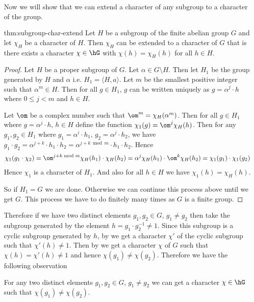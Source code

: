 Now we will show that we can extend a character of any subgroup to a character of the group.
\begin{Theorem}{}{thm:subgroup-char-extend}
  Let $H$ be a subgroup of the finite abelian group $G$ and let $\chi_H$ be a character of $H$. Then $\chi_H$ can be extended to a character of $G$ that is there exists a character $\chi\in\hG$ with $\chi(h)=\chi_H(h)$ for all $h\in H$.
\end{Theorem}
\begin{proof}
  Let $H$ be a proper subgroup of $G$. Let $\alpha\in G\setminus H$. Then let $H_1$ be the group generated by $H$ and $\alpha$ i.e. $H_1=\langle H,a\rangle$. Let $m$ be the smallest positive integer such that $\alpha^m\in H$. Then for all $g\in H_1$, $g$ can be written uniquely as $g=\alpha^j\cdot h$ where $0\leq j<m$ and $h\in H$.

  Let $\om$ be a complex number such that $\om^m=\chi_H(\alpha^m)$. Then for all $g\in H_1$ where $g=\alpha^j\cdot h$, $h\in H$ define the function $\chi_1(g)=\om^j \chi_H(h)$. Then for any $g_1,g_2\in H_1$ where $g_1=\alpha^i\cdot h_1$, $g_2=\alpha^j\cdot h_2$, we have $g_1\cdot g_2=\alpha^{j+k}\cdot h_1\cdot h_2=\alpha^{j+k\bmod{m}}\cdot h_1\cdot h_2$. Hence $$\chi_1(g_1\cdot \chi_2)=\om^{j+k \bmod{m}}\chi_H(h_1)\cdot \chi_H(h_2)=\alpha^j\chi_H(h_1)\cdot \om^k\chi_H(h_2)=\chi_1(g_1)\cdot \chi_1(g_2)$$Hence $\chi_1$ is a character of $H_1$. And also for all $h\in H$ we have $\chi_1(h)=\chi_H(h)$.

  So if $H_1=G$ we are done. Otherwise we can continue this process above until we get $G$. This process we have to do finitely many times as $G$ is a finite group.
\end{proof}


Therefore if we have two distinct elements $g_1,g_2\in G$, $g_1\neq g_2$ then take the subgroup generated by the element $h=g_1\cdot g_2^{-1}\neq 1$. Since this subgroup is a cyclic subgroup generated by $h$, by  we get a character $\chi'$ of the cyclic subgroup such that $\chi'(h)\neq 1$. Then by  we get a character $\chi$ of $G$ such that $\chi(h)=\chi'(h)\neq 1$ and hence $\chi(g_1)\neq \chi(g_2)$. Therefore we have the following observation
\begin{observation}
  For any two distinct elements $g_1,g_2\in G$, $g_1\neq g_2$ we can get a character $\chi\in\hG$ such that $\chi(g_1)\neq \chi(g_2)$.
\end{observation}

